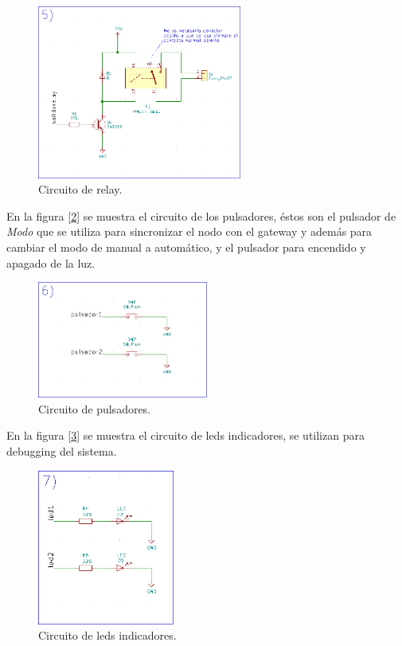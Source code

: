 \begin{figure}[h!]
	\centering
	\includegraphics[width=0.6\textwidth]{./Figures/esquematico5.png}
	\caption{Circuito de relay.}
	\label{fig:esquematico5}
\end{figure}

En la figura [\ref{fig:esquematico6}] se muestra el circuito de los pulsadores, éstos son el pulsador de {\textit{Modo}} que se utiliza para sincronizar el nodo con el gateway y además para cambiar el modo de manual a automático, y el pulsador para encendido y apagado de la luz.

\begin{figure}[h!]
	\centering
	\includegraphics[width=0.5\textwidth]{./Figures/esquematico6.png}
	\caption{Circuito de pulsadores.}
	\label{fig:esquematico6}
\end{figure}

En la figura [\ref{fig:esquematico7}] se muestra el circuito de leds indicadores, se utilizan para debugging del sistema.

\begin{figure}[h!]
	\centering
	\includegraphics[width=0.4\textwidth]{./Figures/esquematico7.png}
	\caption{Circuito de leds indicadores.}
	\label{fig:esquematico7}
\end{figure}

